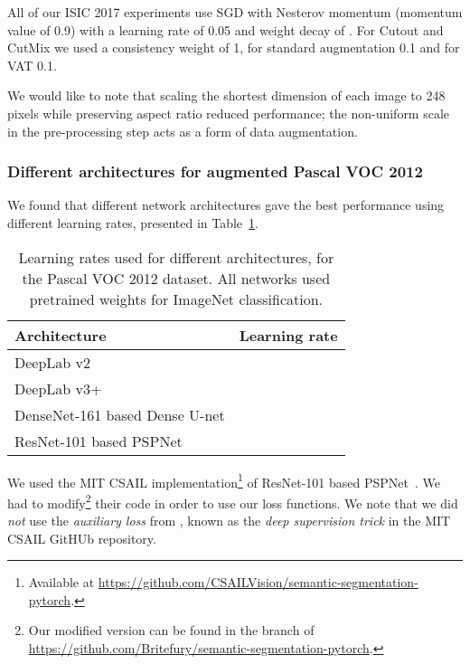 \documentclass{bmvc2k}
\begin{document}
All of our ISIC 2017 experiments use SGD with Nesterov momentum \cite{Sutskever:InitMomentum} (momentum value of 0.9) with a learning rate of 0.05 and weight decay of .
For Cutout and CutMix we used a consistency weight of 1, for standard augmentation 0.1 and for VAT 0.1.

We would like to note that scaling the shortest dimension of each image to 248 pixels while preserving aspect ratio reduced performance;
the non-uniform scale in the pre-processing step acts as a form of data augmentation.


\subsubsection{Different architectures for augmented Pascal VOC 2012}

We found that different network architectures gave the best performance using different learning rates, presented in Table~\ref{tab:sup:lrs}.

\begin{table}[t]
\begin{center}\begin{tabular}{@{ }ll@{ }}
\hline
Architecture 							& Learning rate 				\\
\hline
DeepLab v2 								& 			\\
DeepLab v3+ 							& 			\\
DenseNet-161 based Dense U-net 			& 			\\
ResNet-101 based PSPNet 				& 			\\

\hline
\end{tabular}\caption{Learning rates used for different architectures, for the Pascal VOC 2012 dataset. All networks used pretrained weights for ImageNet classification.
}
\label{tab:sup:lrs}
\end{center}
\end{table}

We used the MIT CSAIL implementation\footnote{Available at \url{https://github.com/CSAILVision/semantic-segmentation-pytorch}.} of ResNet-101 based PSPNet~\cite{Zhao:PSPNet}.
We had to modify\footnote{Our modified version can be found in the  branch of \url{https://github.com/Britefury/semantic-segmentation-pytorch}.} their code in order to use our loss functions. 
We note that we did \emph{not} use the \emph{auxiliary loss} from \cite{Zhao:PSPNet}, known as the \emph{deep supervision trick} in the MIT CSAIL GitHUb repository.
\end{document}
